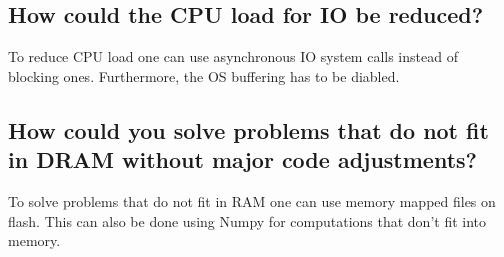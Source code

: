 \documentclass[runningheads]{llncs}
\begin{document}
\subsection{How could the CPU load for IO be reduced?}
To reduce CPU load one can use asynchronous IO system calls instead of blocking ones.
Furthermore, the OS buffering has to be diabled.

\subsection{How could you solve problems that do not fit in DRAM without major code adjustments?}
To solve problems that do not fit in RAM one can use memory mapped files on flash. 
This can also be done using Numpy for computations that don't fit into memory.

%
%
%
% 
% 
%
% 
%
\end{document}
